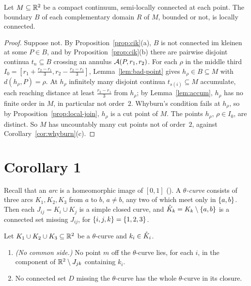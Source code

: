 \begin{theorem}\label{thm:whyburn14}
Let $M\subseteq\mathbb{R}^2$ be a compact continuum, semi-locally connected at each point. The boundary $B$ of each complementary domain $R$ of $M$, bounded or not, is locally connected.
\end{theorem}

\begin{proof}
Suppose not. By Proposition~\ref{prop:cik}(a), $B$ is not connected im kleinen at some $P\in B$, and by Proposition~\ref{prop:cik}(b) there are pairwise disjoint continua $t_n\subseteq B$ crossing an
annulus $\mathcal{A}(P,r_1,r_2)$. For each $\rho$ in the middle third $I_0=[r_1+\frac{r_2-r_1}3,r_2-\frac{r_2-r_1}3]$, Lemma~\ref{lem:bad-point} gives $h_\rho\in B\subseteq M$ with $d(h_\rho,P)=\rho$. At $h_\rho$ infinitely many
disjoint continua $t_{s(i)}\subseteq M$ accumulate, each reaching distance at least $\frac{r_2-r_1}3$ from $h_\rho$; by Lemma~\ref{lem:accum}, $h_\rho$ has no finite order in $M$, in particular not order~$2$.
Whyburn's condition fails at $h_\rho$, so by Proposition~\ref{prop:local-join}, $h_\rho$ is a cut point of $M$. The points $h_\rho$, $\rho\in I_0$, are distinct. So $M$ has uncountably many cut points not of
order~$2$, against Corollary~\ref{cor:whyburn}(c).
\end{proof}


\section{Corollary 1}

Recall that an \emph{arc} is a homeomorphic image of $[0,1]$ (). A \emph{$\theta$-curve} consists of three arcs $K_1,K_2,K_3$ from $a$ to $b$, $a\ne b$, any two of which meet only in
$\left\{ a,b \right\}$. Then each $J_{ij}=K_i\cup K_j$ is a simple closed curve, and $\mathring{K}_k=K_k\setminus\left\{ a,b \right\}$ is a connected set missing $J_{ij}$, for $\left\{ i,j,k \right\}=\left\{ 1,2,3 \right\}$.

\begin{lemma}\label{lem:theta}
Let $K_1\cup K_2\cup K_3\subseteq\mathbb{R}^2$ be a $\theta$-curve and $k_i\in\mathring{K}_i$.
\begin{enumerate}[label=(\alph*)]
\item \emph{(No common side.)} No point $m$ off the $\theta$-curve lies, for each $i$, in the component of $\mathbb{R}^2\setminus J_{jk}$ containing $k_i$.
\item No connected set $D$ missing the $\theta$-curve has the whole $\theta$-curve in its closure.
\end{enumerate}
\end{lemma}

